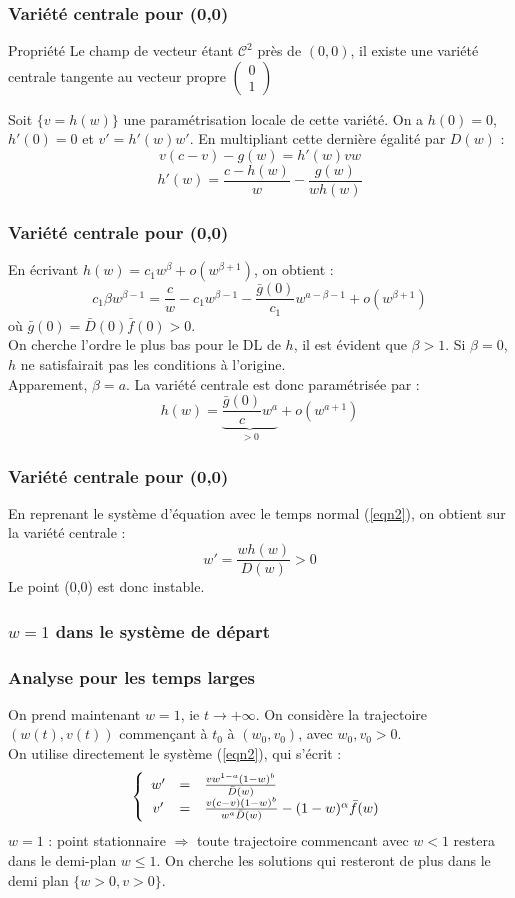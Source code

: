 \documentclass[handout]{beamer}
\begin{document}
\begin{frame}
	\frametitle{Variété centrale pour (0,0)}
\begin{block}{Propriété}
Le champ de vecteur étant $\mathcal{C}^2$ près de $(0,0)$, il existe une variété centrale tangente au vecteur propre $\begin{pmatrix} 0\\ 1 \end{pmatrix}$
\end{block}

Soit $\{v=h(w)\}$ une paramétrisation locale de cette variété. On a $h(0)=0$, $h'(0)=0$ et $v'=h'(w)w'$. En multipliant cette dernière égalité par $D(w)$ : 
\[v(c-v)-g(w)=h'(w)vw\]
\[h'(w)=\frac{c-h(w)}{w}-\frac{g(w)}{wh(w)}\]
\end{frame}

\begin{frame}
	\frametitle{Variété centrale pour (0,0)}
En écrivant $h(w)=c_1 w^\beta+o(w^{\beta+1})$, on obtient :
\[c_1\beta w^{\beta-1}=\frac{c}{w}-c_1w^{\beta-1}-\frac{\bar{g}(0)}{c_1}w^{a-\beta-1}+o(w^{\beta+1})\]
où $\bar{g}(0)=\bar{D}(0)\bar{f}(0)>0$.\\
On cherche l'ordre le plus bas pour le DL de $h$, il est évident que $\beta>1$. Si $\beta=0$, $h$ ne satisfairait pas les conditions à l'origine.\\
Apparement, $\beta=a$. La variété centrale est donc paramétrisée par : 
\[h(w)=\underbrace{\frac{\bar{g}(0)}{c}w^a}_{>0}+o(w^{a+1})\]
\end{frame}

\begin{frame}
	\frametitle{Variété centrale pour (0,0)}
En reprenant le système d'équation avec le temps normal (\ref{eqn2}), on obtient sur la variété centrale : \[w'=\frac{wh(w)}{D(w)}>0\]
Le point (0,0) est donc instable.


\end{frame}

\subsubsection{$w=1$ dans le système de départ}

\begin{frame}
	\frametitle{Analyse pour les temps larges}
	On prend maintenant $w=1$, ie $t\to+\infty$. On considère la trajectoire $(w(t), v(t))$ commençant à $t_0$ à $(w_0, v_0)$, avec $w_0,v_0>0$.\\
On utilise directement le système (\ref{eqn2}), qui s'écrit : 
\[\left\{ \begin{array}{c c l}
w'&=&\frac{vw^{1-a}(1-w)^b}{\bar{D}(w)}\\
v'&=&\frac{v(c-v)(1-w)^b}{w^a\bar{D}(w)}-(1-w)^\alpha \bar{f}(w)
\end{array}\right.\] 
$w=1$ : point stationnaire $\Rightarrow$ toute trajectoire commencant avec $w<1$ restera dans le demi-plan $w\leq 1$. On cherche les solutions qui resteront de plus dans le demi plan $\{w>0, v>0\}$.
\end{frame}
\end{document}
